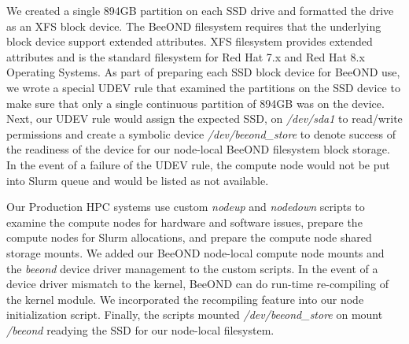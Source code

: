 We created a single 894GB partition on each SSD drive and formatted the drive as an XFS block device.  The BeeOND filesystem requires that the underlying block device support extended attributes. XFS filesystem provides extended attributes and is the standard filesystem for Red Hat 7.x and Red Hat 8.x Operating Systems.  As part of preparing each SSD block device for BeeOND use, we wrote a special UDEV rule that examined the partitions on the SSD device to make sure that only a single continuous partition of 894GB was on the device.  Next, our UDEV rule would assign the expected SSD, on \textit{/dev/sda1} to read/write permissions and create a symbolic device \textit{/dev/beeond\_store} to denote success of the readiness of the device for our node-local BeeOND filesystem block storage.  In the event of a failure of the UDEV rule, the compute node would not be put into Slurm queue and would be listed as not available.  

Our Production HPC systems use custom \textit{nodeup} and \textit{nodedown} scripts to examine the compute nodes for hardware and software issues, prepare the compute nodes for Slurm allocations, and prepare the compute node shared storage mounts.  We added our BeeOND node-local compute node mounts and the \textit{beeond} device driver management to the custom scripts.  In the event of a device driver mismatch to the kernel, BeeOND can do run-time re-compiling of the kernel module.  We incorporated the recompiling feature into our node initialization script.  Finally, the scripts mounted \textit{/dev/beeond\_store} on mount \textit{/beeond} readying the SSD for our node-local filesystem.

